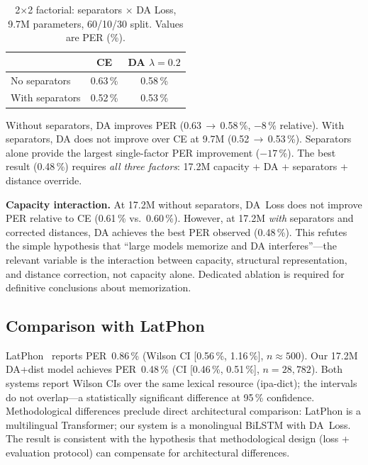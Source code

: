 \documentclass[conference]{IEEEtran}
\newcommand{\lam}{\lambda}                %
\begin{document}
\begin{table}[t]
  \caption{2$\times$2 factorial: separators $\times$ DA Loss,
           9.7M parameters, 60/10/30 split. Values are PER (\%).}
  \label{tab:factorial}
  \centering\small
  \begin{tabular}{lcc}
    \toprule
    & CE & DA $\lam\!=\!0.2$ \\
    \midrule
    No separators   & 0.63\,\% & 0.58\,\% \\
    With separators & 0.52\,\% & 0.53\,\% \\
    \bottomrule
  \end{tabular}
\end{table}

Without separators, DA improves PER (0.63\,$\to$\,0.58\,\%,
$-8$\,\% relative).
With separators, DA does not improve over CE at 9.7M
(0.52\,$\to$\,0.53\,\%).
Separators alone provide the largest single-factor PER improvement
($-17$\,\%).
The best result (0.48\,\%) requires \emph{all three factors}:
17.2M capacity + DA + separators + distance override.

\textbf{Capacity interaction.}
At 17.2M without separators, DA~Loss does not improve PER relative
to CE (0.61\,\% vs.\ 0.60\,\%).
However, at 17.2M \emph{with} separators and corrected distances,
DA achieves the best PER observed (0.48\,\%).
This refutes the simple hypothesis that ``large models memorize and
DA interferes''---the relevant variable is the interaction between
capacity, structural representation, and distance correction, not
capacity alone.
Dedicated ablation is required for definitive conclusions about
memorization.

\subsection{Comparison with LatPhon}

LatPhon~\cite{chary2025latphon} reports PER~0.86\,\%
(Wilson CI [0.56\,\%, 1.16\,\%], $n\!\approx\!500$).
Our 17.2M DA+dist model achieves PER~0.48\,\%
(CI [0.46\,\%, 0.51\,\%], $n\!=\!28{,}782$).
Both systems report Wilson CIs over the same lexical resource
(ipa-dict); the intervals do not overlap---a statistically
significant difference at 95\,\% confidence.
Methodological differences preclude direct architectural comparison:
LatPhon is a multilingual Transformer; our system is a monolingual
BiLSTM with DA~Loss.
The result is consistent with the hypothesis that methodological
design (loss + evaluation protocol) can compensate for architectural
differences.
\end{document}
